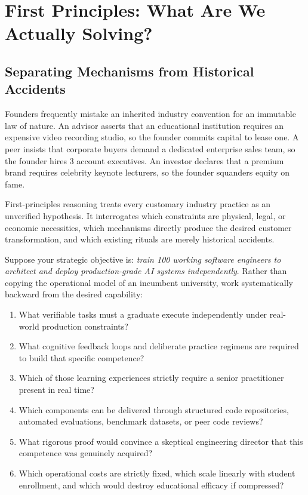 \section{First Principles: What Are We Actually Solving?}

\subsection{Separating Mechanisms from Historical Accidents}

Founders frequently mistake an inherited industry convention for an immutable law of nature. An advisor asserts that an educational institution requires an expensive video recording studio, so the founder commits capital to lease one. A peer insists that corporate buyers demand a dedicated enterprise sales team, so the founder hires 3 account executives. An investor declares that a premium brand requires celebrity keynote lecturers, so the founder squanders equity on fame.

First-principles reasoning treats every customary industry practice as an unverified hypothesis. It interrogates which constraints are physical, legal, or economic necessities, which mechanisms directly produce the desired customer transformation, and which existing rituals are merely historical accidents.

Suppose your strategic objective is: \textit{train 100 working software engineers to architect and deploy production-grade AI systems independently}. Rather than copying the operational model of an incumbent university, work systematically backward from the desired capability:

\begin{enumerate}[leftmargin=12pt,itemsep=2pt,topsep=1pt,parsep=0pt]
  \item What verifiable tasks must a graduate execute independently under real-world production constraints?
  \item What cognitive feedback loops and deliberate practice regimens are required to build that specific competence?
  \item Which of those learning experiences strictly require a senior practitioner present in real time?
  \item Which components can be delivered through structured code repositories, automated evaluations, benchmark datasets, or peer code reviews?
  \item What rigorous proof would convince a skeptical engineering director that this competence was genuinely acquired?
  \item Which operational costs are strictly fixed, which scale linearly with student enrollment, and which would destroy educational efficacy if compressed?
\end{enumerate}

